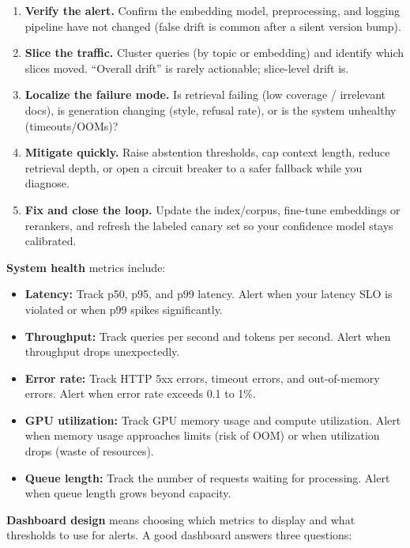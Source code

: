 \begin{pausebox}[title=When a drift alert fires (what to do)]
\begin{enumerate}
\item \textbf{Verify the alert.} Confirm the embedding model, preprocessing, and logging pipeline have not changed (false drift is common after a silent version bump).
\item \textbf{Slice the traffic.} Cluster queries (by topic or embedding) and identify which slices moved. ``Overall drift'' is rarely actionable; slice-level drift is.
\item \textbf{Localize the failure mode.} Is retrieval failing (low coverage / irrelevant docs), is generation changing (style, refusal rate), or is the system unhealthy (timeouts/OOMs)?
\item \textbf{Mitigate quickly.} Raise abstention thresholds, cap context length, reduce retrieval depth, or open a circuit breaker to a safer fallback while you diagnose.
\item \textbf{Fix and close the loop.} Update the index/corpus, fine-tune embeddings or rerankers, and refresh the labeled canary set so your confidence model stays calibrated.
\end{enumerate}
\end{pausebox}

\textbf{System health} metrics include:

\begin{itemize}
\item \textbf{Latency:} Track p50, p95, and p99 latency. Alert when your latency SLO is violated or when p99 spikes significantly.
\item \textbf{Throughput:} Track queries per second and tokens per second. Alert when throughput drops unexpectedly.
\item \textbf{Error rate:} Track HTTP 5xx errors, timeout errors, and out-of-memory errors. Alert when error rate exceeds 0.1 to 1\%.
\item \textbf{GPU utilization:} Track GPU memory usage and compute utilization. Alert when memory usage approaches limits (risk of OOM) or when utilization drops (waste of resources).
\item \textbf{Queue length:} Track the number of requests waiting for processing. Alert when queue length grows beyond capacity.
\end{itemize}

\textbf{Dashboard design} means choosing which metrics to display and what thresholds to use for alerts. A good dashboard answers three questions:

